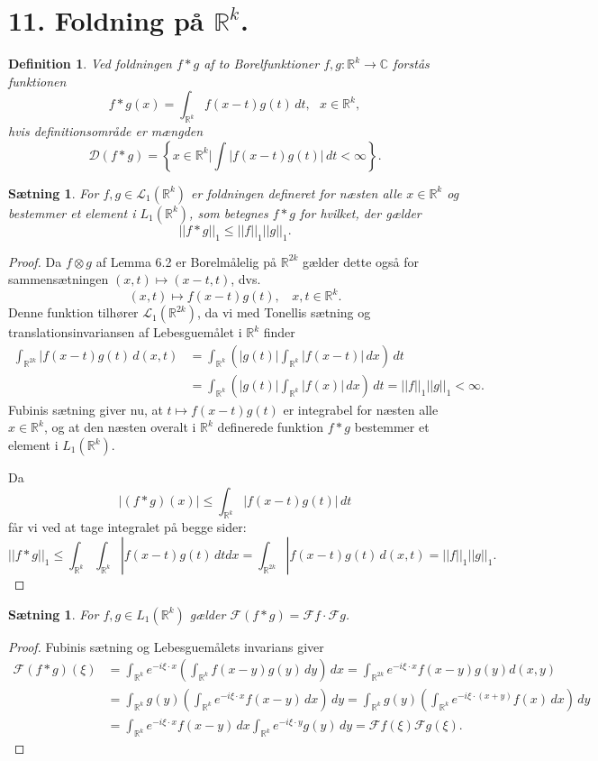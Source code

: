 \documentclass[12pt]{report}
\newtheorem{theorem}[lemma]{Sætning}
\newtheorem{definition}[lemma]{Definition}
\theoremstyle{break}
\newtheorem*{proof}{Bevis}
\theoremstyle{break}
\newcommand{\RR}{\mathbb{R}}
\newcommand{\DD}{\mathcal{D}}
\newcommand{\FI}{\mathcal{F}}
\renewcommand{\L}{\mathcal{L}}
\newcommand{\laengde}[1]{\lvert|#1\rvert|}
\begin{document}
\section*{11. Foldning på $\RR^k$.}
\begin{definition}
Ved foldningen $f\ast g$ af to Borelfunktioner $f,g\colon\RR^k\to\mathbb{C}$ forstås funktionen \[f\ast g(x)=\int_{\RR^k}f(x-t)g(t)\,dt,~~~x\in\RR^k,\]
hvis definitionsområde er mængden 
\[\DD(f\ast g) = \left\{x\in\RR^k\vert\int|f(x-t)g(t)|\,dt<\infty\right\}.\]
\end{definition}
\begin{theorem}
For $f,g\in\L_1(\RR^k)$ er foldningen defineret for næsten alle $x\in\RR^k$ og bestemmer et element i $L_1(\RR^k)$, som betegnes $f\ast g$ for hvilket, der gælder \[\laengde{f\ast g}_1\leq\laengde{f}_1\laengde{g}_1.\]
\end{theorem}
\begin{proof}
Da $f\otimes g$ af Lemma 6.2 er Borelmålelig på $\RR^{2k}$ gælder dette også for sammensætningen $(x,t)\mapsto(x-t,t)$, dvs.
\[(x,t)\mapsto f(x-t)g(t),~~~~x,t\in\RR^k.\]
Denne funktion tilhører $\L_1(\RR^{2k})$, da vi med Tonellis sætning og translationsinvariansen af Lebesguemålet i $\RR^k$ finder
\begin{align*}
\int_{\RR^{2k}}|f(x-t)g(t)\,d(x,t) & =\int_{\RR^k}\left(|g(t)|\int_{\RR^k}|f(x-t)|\,dx\right)\,dt \\ &=\int_{\RR^k}\left(|g(t)|\int_{\RR^k}|f(x)|\,dx\right)\,dt = \laengde{f}_1\laengde{g}_1<\infty.
\end{align*}
Fubinis sætning giver nu, at $t\mapsto f(x-t)g(t)$ er integrabel for næsten alle $x\in\RR^k$, og at den næsten overalt i $\RR^k$ definerede funktion $f\ast g$ bestemmer et element i $L_1(\RR^k)$.

\bigskip

Da
\[|(f\ast g)(x)|\leq\int_{\RR^k}|f(x-t)g(t)|\,dt\]
får vi ved at tage integralet på begge sider:
\[\laengde{f\ast g}_1\leq\int_{\RR^k}\int_{\RR^k}|f(x-t)g(t)\,dtdx=\int_{\RR^{2k}}|f(x-t)g(t)\,d(x,t)=\laengde{f}_1\laengde{g}_1.\]
\end{proof}
\begin{theorem}
For $f,g\in L_1(\RR^k)$ gælder $\FI(f\ast g)=\FI f\cdot \FI g$.
\end{theorem}
\begin{proof}
Fubinis sætning og Lebesguemålets invarians giver
\begin{align*}
\FI(f\ast g)(\xi) & = \int_{\RR^k}e^{-i\xi\cdot x}\left(\int_{\RR^k}f(x-y)g(y)\,dy\right)\,dx = \int_{\RR^{2k}}e^{-i\xi\cdot x}f(x-y)g(y)d(x,y)\\ & = \int_{\RR^k}g(y)\left(\int_{\RR^k}e^{-i\xi\cdot x}f(x-y)\,dx\right)\,dy = \int_{\RR^k}g(y)\left(\int_{\RR^k}e^{-i\xi\cdot (x+y)}f(x)\,dx\right)\,dy \\ & = \int_{\RR^k}e^{-i\xi\cdot x}f(x-y)\,dx\int_{\RR^k}e^{-i\xi\cdot y}g(y)\,dy = \FI f(\xi)\FI g(\xi).
\end{align*}
\end{proof}
\end{document}
